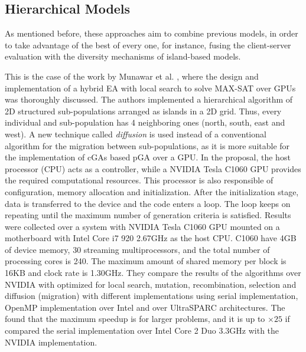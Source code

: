 \documentclass{article}
\begin{document}
\subsection{Hierarchical Models}

As mentioned before, these approaches aim to combine previous models,
in order to take advantage of the best of every one, for instance,
fusing the client-server evaluation with the diversity mechanisms of
island-based models. 

This is the case of the work by Munawar et
al. \cite{Munawar:2009:HGA:1666141_1666143}, where the design and
implementation of a hybrid EA with local search to solve MAX-SAT over
GPUs was thoroughly discussed. The authors implemented a hierarchical
algorithm of 2D structured sub-populations arranged as islands in a 2D
grid. Thus, every individual and sub-population has 4 neighboring ones
(north, south, east and west). A new technique called {\em diffusion}
is used instead of a conventional algorithm for the migration between
sub-populations, as it is more suitable for the implementation of cGAs
based pGA over a GPU. In the proposal, the host processor (CPU) acts
as a controller, while a NVIDIA Tesla C1060 GPU provides the required
computational resources. This processor is also responsible of
configuration, memory allocation and initialization. After the
initialization stage, data is transferred to the device and the code
enters a loop. The loop keeps on repeating until the maximum number of
generation criteria is satisfied. Results were collected over a system
with NVIDIA Tesla C1060 GPU mounted on a motherboard with Intel Core
i7 920 2.67GHz as the host CPU. C1060 have 4GB of device memory, 30
streaming multiprocessors, and the total number of processing cores is
240. The maximum amount of shared memory per block is 16KB and clock
rate is 1.30GHz. They compare the results of the algorithms over
NVIDIA with optimized for local search, mutation, recombination,
selection and diffusion (migration) with different implementations
using serial implementation, OpenMP implementation over Intel and over
UltraSPARC architectures. The found that the maximum speedup is for
larger problems, and it is up to $\times25$ if compared the serial
implementation over Intel Core 2 Duo 3.3GHz with the NVIDIA
implementation. 

\end{document}
